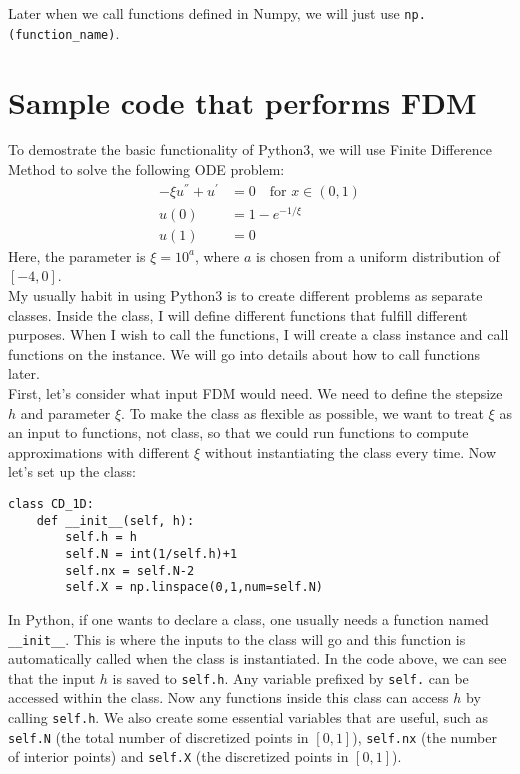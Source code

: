 \documentclass{article}
\begin{document}
Later when we call functions defined in Numpy, we will just use \texttt{np.(function\_name)}. 

\section{Sample code that performs FDM}
To demostrate the basic functionality of Python3, we will use Finite Difference Method to solve the following ODE problem:
\begin{equation}
\begin{split}
-\xi u^{''}+u^{'} &= 0 \quad \text{for }x\in (0,1)\\
u(0) &= 1-e^{-1/\xi}\\
u(1) &= 0
\end{split}
\label{eq:1d_cd}
\end{equation}
Here, the parameter is $\xi=10^{a}$, where $a$ is chosen from a uniform distribution of $[-4,0]$. \\

My usually habit in using Python3 is to create different problems as separate classes. Inside the class, I will define different functions that fulfill different purposes. When I wish to call the functions, I will create a class instance and call functions on the instance. We will go into details about how to call functions later. \\

First, let's consider what input FDM would need. We need to define the stepsize $h$ and parameter $\xi$. To make the class as flexible as possible, we want to treat $\xi$ as an input to functions, not class, so that we could run functions to compute approximations with different $\xi$ without instantiating the class every time. Now let's set up the class:
\begin{lstlisting}
class CD_1D:
	def __init__(self, h):
		self.h = h
		self.N = int(1/self.h)+1
		self.nx = self.N-2
		self.X = np.linspace(0,1,num=self.N)
\end{lstlisting}

In Python, if one wants to declare a class, one usually needs a function named \texttt{\_\_init\_\_}. This is where the inputs to the class will go and this function is automatically called when the class is instantiated. In the code above, we can see that the input $h$ is saved to \texttt{self.h}. Any variable prefixed by \texttt{self.} can be accessed within the class. Now any functions inside this class can access $h$ by calling \texttt{self.h}. We also create some essential variables that are useful, such as \texttt{self.N} (the total number of discretized points in $[0,1]$), \texttt{self.nx} (the number of interior points) and \texttt{self.X} (the discretized points in $[0,1]$). \\
\end{document}
